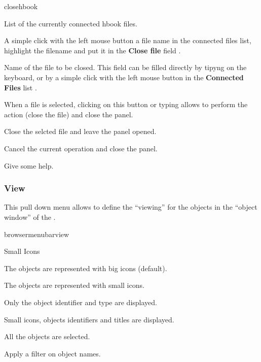 \begin{PAWf}[.55]{closehbook}
\begin{EnumZW}
\item List of the currently connected hbook files.
\item A simple click with the left mouse button a file name
      in the connected files list, highlight the filename
      and put it in the {\bf Close file} field .
\item Name of the file to be closed. This field can be filled
      directly by tipyng on the keyboard, or by a simple click
      with the left mouse button in the {\bf Connected Files}
      list .
\end{EnumZW}
\begin{EnumZB}
\item When a file is selected, clicking on this button or
      typing  allows to perform the action (close
      the file) and close the panel.
\item Close the selcted file and leave the panel opened.
\item Cancel the current operation and close the panel.
\item  Give some help.
\end{EnumZB}
\end{PAWf}

\subsubsection{View}

This pull down menu allows to define the ``viewing'' for the objects
in the ``object window'' of the \MB.

\begin{PAWf}[.2]{browsermenubarview}
\begin{DLsf}{Small Icons}
\item[Icons]       The objects are represented with big icons (default).
\item[Small Icons] The objects are represented with small icons.
\item[No Icons]    Only the object identifier and type are displayed.
\item[Titles]      Small icons, objects identifiers and titles are displayed.
\item[Select All]  All the objects are selected.
\item[Filter...]   Apply a filter on object names.
\end{DLsf}
\end{PAWf}

